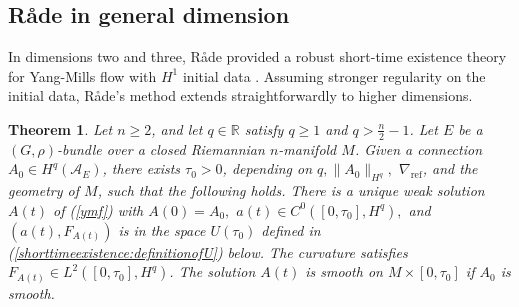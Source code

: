 \documentclass[12pt]{amsart}
\renewcommand{\1}{{\mathbf 1}}
\newcommand{\R}{{\mathbb R}}
\newtheorem{thm}{Theorem}[section]
\theoremstyle{others}
\numberwithin{equation}{section}
\begin{document}
\vspace{5mm}




\subsection{R{\aa}de in general dimension} \label{radegendim}
In dimensions two and three, R{\aa}de provided a robust short-time existence theory for Yang-Mills flow with \(H^1\) initial data \cite{radethesis, rade}. Assuming stronger regularity on the initial data, R{\aa}de's method extends straightforwardly to higher dimensions. %
\begin{thm}\label{thm:shorttimeexistence}
     Let \(n \geq 2\), and let \(q \in \R\) satisfy \(q \geq 1\) and \(q > \frac{n}{2} - 1\). Let \(E\) be a \((G, \rho)\)-bundle over a closed Riemannian \(n\)-manifold \(M\). Given a connection \(A_0 \in H^q(\mathcal{A}_E)\), there exists \(\tau_0 > 0\), depending on \(q, \|A_0\|_{H^q},\) \(\nabla_{\text{ref}}\), and the geometry of \(M\), such that the following holds. There is a unique weak solution \(A(t) \) of (\ref{ymf}) with \(A(0) = A_0,\) $a(t) \in C^0([0, \tau_0], H^q),$ and $\left(a(t), F_{A(t)} \right)$ is in the space $U(\tau_0)$ defined in (\ref{shorttimeexistence:definitionofU}) below.
     The curvature satisfies \(F_{A(t)} \in L^2([0, \tau_0], H^q)\).
     The solution \(A(t)\) is smooth on \(M \times [0, \tau_0]\) if \(A_0\) is smooth.
 \end{thm}
 
\end{document}
